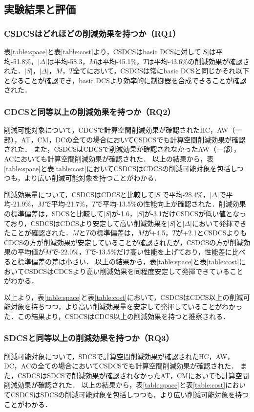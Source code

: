 

\subsection{実験結果と評価}
\label{subsection:result}

\subsubsection{CSDCSはどれほどの削減効果を持つか（RQ1）}
表\ref{table:space}と表\ref{table:cost}より，CSDCSはbasic DCSに対して$|S|$は平均-51.8\%，$|\Delta|$は平均-58.3，$M$は平均-45.1\%，$T$は平均-43.6\%の削減効果が確認された．$|S|$，$|\Delta|$，$M$，$T$全てにおいて，CSDCSは常にbasic DCSと同じかそれ以下となることが確認でき，basic DCSより効率的に制御器を合成できることが確認された．

\subsubsection{CDCSと同等以上の削減効果を持つか（RQ2）}
削減可能対象について，CDCSで計算空間削減効果が確認されたHC，AW（一部），AT，CM，DCの全ての場合においてCSDCSでも計算空間削減効果が確認された．
また，CSDCSはCDCSで削減効果が確認されなかったAW（一部），ACにおいても計算空間削減効果が確認された．
以上の結果から，表\ref{table:space}と表\ref{table:cost}においてCSDCSはCDCSの削減可能対象を包括しつつも，より広い削減可能対象を持つことがわかる．

削減効果量について，CSDCSはCDCSと比較して$|S|$で平均-28.4\%，$|\Delta|$で平均-21.9\%，$M$で平均-21.7\%，$T$で平均-13.5\%の性能向上が確認された．削減効果の標準偏差は，SDCSと比較して$|S|$が-1.6，$|S|$が-3.1だけCSDCSが低い値となっており，CSDCSはCDCSより安定して高い削減効果を$|S|$と$|\Delta|$において発揮できたことが確認された．$M$と$T$の標準偏差は，$M$が+4.5，$T$が+2.1とCSDCSよりもCDCSの方が削減効果が安定していることが確認されたが，CSDCSの方が削減効果の平均値が$M$で-22.0\%，$T$で-13.5\%だけ高い性能を上げており，性能差に比べると標準偏差の差は小さい．
以上の結果から，表\ref{table:space}と表\ref{table:cost}においてCSDCSはCDCSより高い削減効果を同程度安定して発揮できていることがわかる．

以上より，表\ref{table:space}と表\ref{table:cost}において，CSDCSはCDCS以上の削減可能対象を持ちつつ，より高い削減効果量を安定して発揮していることがわかった．この結果より，CSDCSはCDCS以上の削減効果を持つと推察される．

\subsubsection{SDCSと同等以上の削減効果を持つか（RQ3）}
削減可能対象について，SDCSで計算空間削減効果が確認されたHC，AW，DC，ACの全ての場合においてCSDCSでも計算空間削減効果が確認された．
また，CSDCSはSDCSで削減効果が確認されなかったAT，CMにおいても計算空間削減効果が確認された．
以上の結果から，表\ref{table:space}と表\ref{table:cost}においてCSDCSはSDCSの削減可能対象を包括しつつも，より広い削減可能対象を持つことがわかる．

